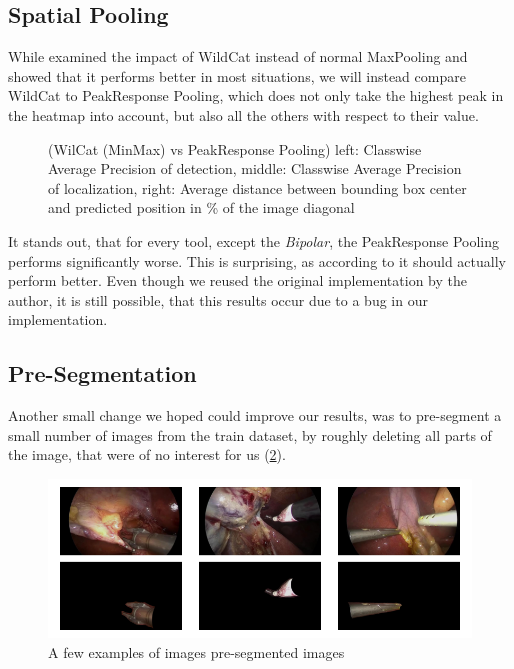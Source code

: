 \FloatBarrier
\subsection{Spatial Pooling}
While \cite{Vardazaryan} examined the impact of WildCat \citep{Wildcat} instead of normal MaxPooling and showed that it performs better in most situations, we will instead compare WildCat to PeakResponse Pooling, which does not only take the highest peak in the heatmap into account, but also all the others with respect to their value.

\begin{figure}[h]
	\centering
	\caption{(WilCat (MinMax) vs PeakResponse Pooling) left: Classwise Average Precision of detection, middle: Classwise Average Precision of localization, right: Average distance between bounding box center and predicted position in \% of the image diagonal}
	\label{fig:peak_distances}
\end{figure}

It stands out, that for every tool, except the \emph{Bipolar}, the PeakResponse Pooling performs significantly worse. This is surprising, as according to \cite{classpeak} it should actually perform better. Even though we reused the original implementation by the author, it is still possible, that this results occur due to a bug in our implementation.

\FloatBarrier
\subsection{Pre-Segmentation}

Another small change we hoped could improve our results, was to pre-segment a small number of images from the train dataset, by roughly deleting all parts of the image, that were of no interest for us (\ref{fig:seg_images}).

\begin{figure}[h]
	\centering
	\includegraphics[width=15cm]{4_experiments/images/5_seg/images.png}
	\caption{A few examples of images pre-segmented images}
	\label{fig:seg_images}
\end{figure}

